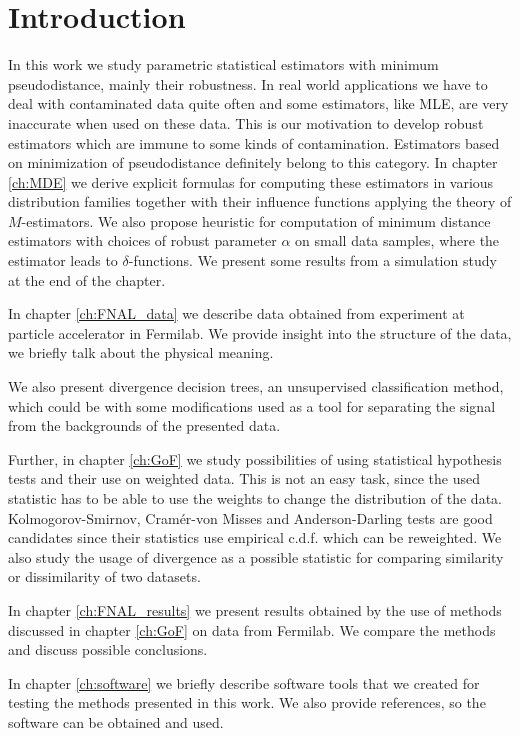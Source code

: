 \chapter*{Introduction} \label{ch:intro}

In this work we study parametric statistical estimators with minimum \ren pseudodistance, mainly their robustness. In real world applications we have to deal with contaminated data quite often and some estimators, like MLE, are very inaccurate when used on these data. This is our motivation to develop robust estimators which are immune to some kinds of contamination. Estimators based on minimization of \ren pseudodistance definitely belong to this category. In chapter \ref{ch:MDE} we derive explicit formulas for computing these estimators in various distribution families together with their influence functions applying the theory of $M$-estimators. We also propose heuristic for computation of minimum \ren distance estimators with choices of robust parameter $\alpha$ on small data samples, where the estimator leads to $\delta$-functions. We present some results from a simulation study at the end of the chapter.

In chapter \ref{ch:FNAL_data} we describe data obtained from experiment \dzero at particle accelerator in Fermilab. We provide insight into the structure of the data, we briefly talk about the physical meaning. 

We also present divergence decision trees, an unsupervised classification method, which could be with some modifications used as a tool for separating the signal from the backgrounds of the presented data.

Further, in chapter \ref{ch:GoF} we study possibilities of using statistical hypothesis tests and their use on weighted data. This is not an easy task, since the used statistic has to be able to use the weights to change the distribution of the data. Kolmogorov-Smirnov, Cramér-von Misses and Anderson-Darling tests are good candidates since their statistics use empirical c.d.f. which can be reweighted. We also study the usage of \ren divergence as a possible statistic for comparing similarity or dissimilarity of two datasets.

In chapter \ref{ch:FNAL_results} we present results obtained by the use of methods discussed in chapter \ref{ch:GoF} on data from Fermilab. We compare the methods and discuss possible conclusions.

In chapter \ref{ch:software} we briefly describe software tools that we  created for testing the methods presented in this work. We also provide references, so the software can be obtained and used. 


